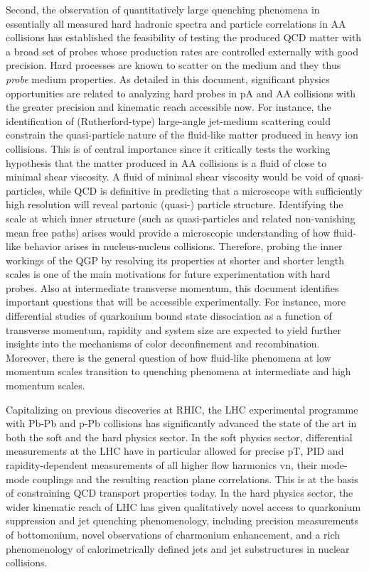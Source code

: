 \documentclass[../report.tex]{subfiles}
\begin{document}
Second, the observation of quantitatively large quenching phenomena in essentially all measured hard hadronic spectra and particle correlations in AA collisions has established the feasibility of testing the produced QCD matter with a broad set of probes whose production rates are controlled externally with good precision. Hard processes are known to scatter on the medium and they thus {\it probe} medium properties. As detailed in this document, significant physics opportunities are related to analyzing hard probes in pA and AA collisions with the greater precision and kinematic reach accessible now. For instance, the identification of (Rutherford-type) large-angle jet-medium scattering could constrain the quasi-particle nature of the fluid-like matter produced in heavy ion collisions. This is of central importance since it critically tests the working hypothesis that the matter produced in AA collisions is a fluid of close to minimal shear viscosity. A fluid of minimal shear viscosity would be void of quasi-particles, while QCD is definitive in predicting that a microscope with sufficiently high resolution will reveal partonic (quasi-) particle structure. Identifying the scale at which inner structure (such as quasi-particles and related non-vanishing mean free paths) arises would provide a microscopic understanding of how fluid-like behavior arises in nucleus-nucleus collisions. Therefore, probing the inner workings of the QGP by resolving its properties at shorter and shorter length scales is one of the main motivations for future experimentation with hard probes. Also at intermediate transverse momentum, this document identifies important questions that will be accessible experimentally. For instance, more differential studies of quarkonium bound state dissociation as a function of transverse momentum, rapidity and system size are expected to yield further insights into the mechanisms of color deconfinement and recombination. Moreover, there is the general question of how fluid-like phenomena at low momentum scales transition to quenching phenomena at intermediate and high momentum scales.

Capitalizing on previous discoveries at RHIC, the LHC experimental programme with Pb-Pb and p-Pb collisions has significantly advanced the state of the art in both the soft and the hard physics sector. In the soft physics sector, differential measurements at the LHC have in particular allowed for precise pT, PID and rapidity-dependent measurements of all higher flow harmonics vn, their mode-mode couplings and the resulting reaction plane correlations. This is at the basis of constraining QCD transport properties today. In the hard physics sector, the wider kinematic reach of LHC has given qualitatively novel access to quarkonium suppression and jet quenching phenomenology, including precision measurements of bottomonium, novel observations of charmonium enhancement, and a rich phenomenology of calorimetrically defined jets and jet substructures in nuclear collisions.
\end{document}
